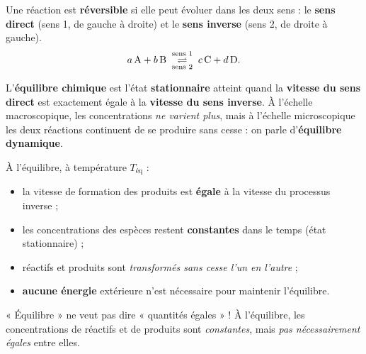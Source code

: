 \documentclass[11pt,a4paper]{article}
\begin{document}
\begin{definition}
Une réaction est \textbf{réversible} si elle peut évoluer dans les deux sens : le \textbf{sens direct}
(sens 1, de gauche à droite) et le \textbf{sens inverse} (sens 2, de droite à gauche).
\[ a\,\ce{A} + b\,\ce{B} \;\underset{\text{sens 2}}{\overset{\text{sens 1}}{\rightleftharpoons}}\;
   c\,\ce{C} + d\,\ce{D}. \]
\end{definition}

\begin{definition}
L'\textbf{équilibre chimique} est l'état \textbf{stationnaire} atteint quand la \textbf{vitesse du sens
direct} est exactement égale à la \textbf{vitesse du sens inverse}. À l'échelle macroscopique, les
concentrations \emph{ne varient plus}, mais à l'échelle microscopique les deux réactions continuent de
se produire sans cesse : on parle d'\textbf{équilibre dynamique}.
\end{definition}

\begin{theoreme}
À l'équilibre, à température $T_{\text{éq}}$ :
\begin{itemize}[leftmargin=1.6em,topsep=2pt,itemsep=1.5pt]
  \item la vitesse de formation des produits est \textbf{égale} à la vitesse du processus inverse ;
  \item les concentrations des espèces restent \textbf{constantes} dans le temps (état stationnaire) ;
  \item réactifs et produits sont \emph{transformés sans cesse l'un en l'autre} ;
  \item \textbf{aucune énergie} extérieure n'est nécessaire pour maintenir l'équilibre.
\end{itemize}
\end{theoreme}

\begin{attention}
« Équilibre » ne veut pas dire « quantités égales » ! À l'équilibre, les concentrations de réactifs et
de produits sont \emph{constantes}, mais \emph{pas nécessairement égales} entre elles.
\end{attention}
\end{document}
